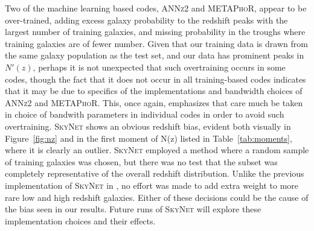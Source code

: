 Two of the machine learning based codes, \textsc{ANNz2} and \textsc{METAPhoR}, appear to be over-trained, adding excess galaxy probability to the redshift peaks with the largest number of training galaxies, and missing probability in the troughs where training galaxies are of fewer number.
Given that our training data is drawn from the same galaxy population as the test set, and our data has prominent peaks in $N'(z)$, perhaps it is not unexpected that such overtraining occurs in some codes, though the fact that it does not occur in all training-based codes indicates that it may be due to specifics of the implementations and bandwidth choices of \textsc{ANNz2} and \textsc{METAPhoR}.
This, once again, emphasizes that care much be taken in choice of bandwith parameters in individual codes in order to avoid such overtraining.
\textsc{SkyNet} shows an obvious redshift bias, evident both visually in Figure~\ref{fig:nz} and in the first moment of N(z) listed in Table~\ref{tab:moments}, where it is clearly an outlier.  \textsc{SkyNet} employed a method where a random sample of training galaxies was chosen, but there was no test that the subset was completely representative of the overall redshift distribution.  Unlike the previous implementation of \textsc{SkyNet} in \citet{Bonnett:15}, no effort was made to add extra weight to more rare low and high redshift galaxies.  Either of these decisions could be the cause of the bias seen in our results.  Future runs of \textsc{SkyNet} will explore these implementation choices and their effects.


